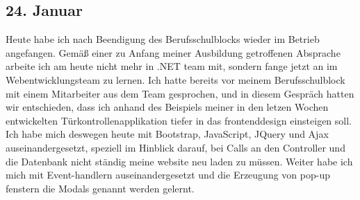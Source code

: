 \subsection{24. Januar}
Heute habe ich nach Beendigung des Berufsschulblocks wieder im Betrieb angefangen. Gemäß einer zu Anfang meiner Ausbildung getroffenen Absprache arbeite ich am heute nicht mehr in .NET team mit, sondern fange jetzt an im Webentwicklungsteam zu lernen. Ich hatte bereits vor meinem Berufsschulblock mit einem Mitarbeiter aus dem Team gesprochen, und in diesem Gespräch hatten wir entschieden, dass ich anhand des Beispiels meiner in den letzen Wochen entwickelten Türkontrollenapplikation tiefer in das frontenddesign einsteigen soll. Ich habe mich deswegen heute mit Bootstrap, JavaScript, JQuery und Ajax auseinandergesetzt, speziell im Hinblick darauf, bei Calls an den Controller und die Datenbank nicht ständig meine website neu laden zu müssen. Weiter habe ich mich mit Event-handlern auseinandergesetzt und die Erzeugung von pop-up fenstern die Modals genannt werden gelernt.